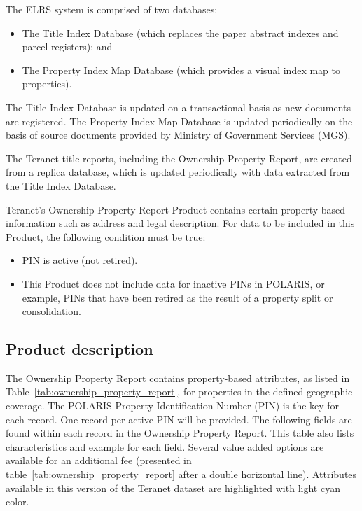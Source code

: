 \documentclass[11pt]{article}
\begin{document}
    \vspace{5mm}

    The ELRS system is comprised of two databases:

    \begin{itemize}
        \item The Title Index Database (which replaces the paper abstract indexes and parcel registers); and
        \item The Property Index Map Database (which provides a visual index map to properties).
    \end{itemize}

    The Title Index Database is updated on a transactional basis as new documents are registered.
    The Property Index Map Database is updated periodically on the basis of source documents provided by Ministry of Government Services (MGS).

    The Teranet title reports, including the Ownership Property Report, are created from a replica database, which is updated periodically with data extracted from the Title Index Database.

    Teranet's Ownership Property Report Product contains certain property based information such as address and legal description.
    For data to be included in this Product, the following condition must be true:
    \begin{itemize}
        \item PIN is active (not retired).
        \item This Product does not include data for inactive PINs in POLARIS, or example, PINs that have been retired as the result of a property split or consolidation.
    \end{itemize}

    \subsection{Product description} \label{subsec:teranet_product_description}

    The Ownership Property Report contains property-based attributes, as listed in Table~\ref{tab:ownership_property_report}, for properties in the defined geographic coverage.
    The POLARIS Property Identification Number (PIN) is the key for each record.
    One record per active PIN will be provided.
    The following fields are found within each record in the Ownership Property Report.
    This table also lists characteristics and example for each field.
    Several value added options are available for an additional fee (presented in table~\ref{tab:ownership_property_report} after a double horizontal line).
    Attributes available in this version of the Teranet dataset are highlighted with light cyan color.
\end{document}
